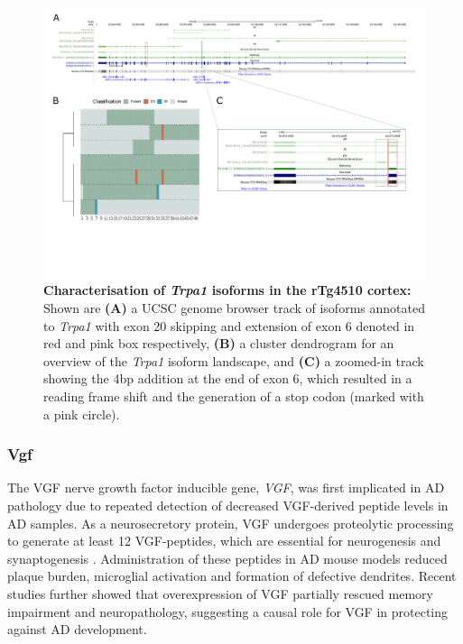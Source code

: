 \begin{landscape}
	\begin{figure}[htp]
		\centering
		\includegraphics[page=13,trim={0 5cm 0 0},scale = 0.85]{Figures/TargetGenes_Annotation_Landscape.pdf}
		\captionsetup{width=1.3\textwidth}
		\caption[Characterisation of \textit{Trpa1} isoforms in the rTg4510 cortex]%
		{\textbf{Characterisation of \textit{Trpa1} isoforms in the rTg4510 cortex:} Shown are \textbf{(A)} a UCSC genome browser track of isoforms annotated to \textit{Trpa1} with exon 20 skipping and extension of exon 6 denoted in red and pink box respectively, \textbf{(B)} a cluster dendrogram for an overview of the \textit{Trpa1} isoform landscape, and \textbf{(C)} a zoomed-in track showing the 4bp addition at the end of exon 6, which resulted in a reading frame shift and the generation of a stop codon (marked with a pink circle).}   
		\label{fig:trpa1}
	\end{figure}
\end{landscape}
\restoregeometry

\newpage
\subsubsection{Vgf}
The VGF nerve growth factor inducible gene, \textit{VGF}, was first implicated in AD pathology due to repeated detection of decreased VGF-derived peptide levels in AD samples\cite{VanSteenoven2019}. As a neurosecretory protein, VGF undergoes proteolytic processing to generate at least 12 VGF-peptides, which are essential for neurogenesis and synaptogenesis \cite{VanSteenoven2019}. Administration of these peptides in AD mouse models reduced plaque burden, microglial activation and formation of defective dendrites\cite{Quinn2021}. Recent studies further showed that overexpression of VGF partially rescued memory impairment and neuropathology, suggesting a causal role for VGF in protecting against AD development\cite{Beckmann2020}. 

